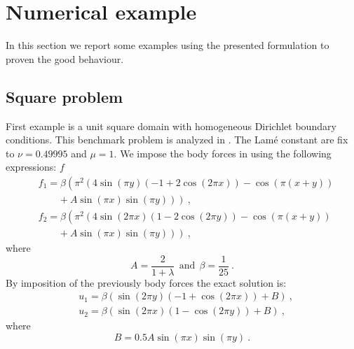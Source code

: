 \documentclass[preprint,12pt,authoryear]{elsarticle}
\begin{document}
\section{Numerical example}\label{sec:five}
In this section we report some examples using the presented formulation to proven the good behaviour. 

\subsection{Square problem}
First example is a unit square domain with homogeneous Dirichlet boundary conditions. This benchmark problem is analyzed in \cite{brenner}.
The Lamé constant are fix to $\nu=0.49995$ and $\mu=1$.
We impose the body forces in using the following expressions:
$f$
\begin{equation}
\begin{split}
&f_{1} = \beta \left(\pi^{2} \left(4\sin\left(\pi y\right)
\left(-1+2\cos\left(2\pi x\right)\right)
-\cos\left(\pi\left(x+y\right)\right) \right.\right. \\
&\left.\left. \hspace{24pt} + A\sin\left(\pi x\right)\sin\left(\pi y\right)\right)\right)\:, \\
&f_{2} = \beta \left(\pi^{2}\left(4\sin\left(2\pi x\right)
\left(1-2\cos\left(2\pi y\right)\right)
-\cos\left(\pi\left(x+y\right)\right)\right.\right. \\
&\left.\left. \hspace{24pt} + A\sin\left(\pi x\right)\sin\left(\pi y\right)\right)\right)\:,
\end{split}
\end{equation}
where
\begin{equation}
A=\frac{2}{1+\lambda} \:\: \mbox{and} \:\: \beta =\frac{1}{25}\:.
\end{equation}
By imposition of the previously body forces the exact solution is:
\begin{equation} \label{eq:exact_solution}
\begin{split}
&u_{1} = \beta\left(\sin\left(2\pi y\right)
\left(-1+\cos\left(2\pi x\right)\right)+B\right)\:, \\
&u_{2} = \beta\left(\sin\left(2\pi x\right)
\left(1-\cos\left(2\pi y\right)\right)+B\right)\:,
\end{split}
\end{equation} 
where 
\begin{equation}
B=0.5A\sin\left(\pi x\right)\sin\left(\pi y\right)\:.
\end{equation}
\end{document}

